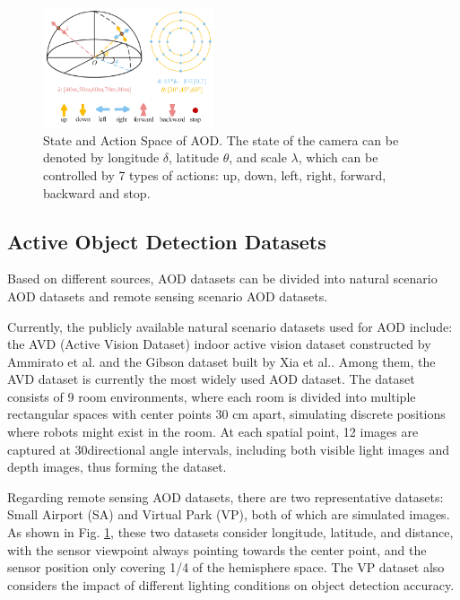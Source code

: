 \documentclass[lettersize,journal]{IEEEtran}
\begin{document}
\begin{figure}[!t]
    \centering
    \includegraphics[width=0.45\textwidth]{fig/state_action.pdf}
    \caption{State and Action Space of AOD. The state of the camera can be denoted by longitude $\delta$, latitude $\theta$, and scale $\lambda$, which can be controlled by 7 types of actions: up, down, left, right, forward, backward and stop.}
    \label{Stat_Action}
\end{figure}

\subsection{Active Object Detection Datasets}
Based on different sources, AOD datasets can be divided into natural scenario AOD datasets and remote sensing scenario AOD datasets.

Currently, the publicly available natural scenario datasets used for AOD include: the AVD (Active Vision Dataset) indoor active vision dataset constructed by Ammirato et al.\cite{dataset2017} and the Gibson dataset built by Xia et al.\cite{gibson2018}. Among them, the AVD dataset is currently the most widely used AOD dataset. The dataset consists of 9 room environments, where each room is divided into multiple rectangular spaces with center points 30 cm apart, simulating discrete positions where robots might exist in the room. At each spatial point, 12 images are captured at 30\degree directional angle intervals, including both visible light images and depth images, thus forming the dataset.

Regarding remote sensing AOD datasets, there are two representative datasets: Small Airport (SA) and Virtual Park (VP)\cite{dynamic2021}, both of which are simulated images. As shown in Fig. \ref{Stat_Action}, these two datasets consider longitude, latitude, and distance, with the sensor viewpoint always pointing towards the center point, and the sensor position only covering 1/4 of the hemisphere space. The VP dataset also considers the impact of different lighting conditions on object detection accuracy.
\end{document}
